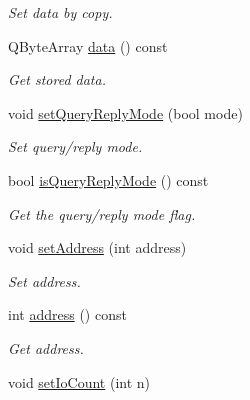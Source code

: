 \begin{DoxyCompactItemize}
\begin{DoxyCompactList}\small\item\em Set data by copy. \end{DoxyCompactList}\item 
\hypertarget{classmdt_port_transaction_a2b4f95dae82de8853e12138b4db616a0}{
QByteArray \hyperlink{classmdt_port_transaction_a2b4f95dae82de8853e12138b4db616a0}{data} () const }
\label{classmdt_port_transaction_a2b4f95dae82de8853e12138b4db616a0}

\begin{DoxyCompactList}\small\item\em Get stored data. \end{DoxyCompactList}\item 
void \hyperlink{classmdt_port_transaction_a6bd68a89059c790f475b8ff78c943656}{setQueryReplyMode} (bool mode)
\begin{DoxyCompactList}\small\item\em Set query/reply mode. \end{DoxyCompactList}\item 
bool \hyperlink{classmdt_port_transaction_a9da1cc7a191cd21a2e532d277aa3c628}{isQueryReplyMode} () const 
\begin{DoxyCompactList}\small\item\em Get the query/reply mode flag. \end{DoxyCompactList}\item 
\hypertarget{classmdt_port_transaction_a7f43ee802c0dee3ee77b45188378f86e}{
void \hyperlink{classmdt_port_transaction_a7f43ee802c0dee3ee77b45188378f86e}{setAddress} (int address)}
\label{classmdt_port_transaction_a7f43ee802c0dee3ee77b45188378f86e}

\begin{DoxyCompactList}\small\item\em Set address. \end{DoxyCompactList}\item 
\hypertarget{classmdt_port_transaction_a0c454829c2d1c2ea1b8bcc9797b2d46b}{
int \hyperlink{classmdt_port_transaction_a0c454829c2d1c2ea1b8bcc9797b2d46b}{address} () const }
\label{classmdt_port_transaction_a0c454829c2d1c2ea1b8bcc9797b2d46b}

\begin{DoxyCompactList}\small\item\em Get address. \end{DoxyCompactList}\item 
\hypertarget{classmdt_port_transaction_a1d68527258d24907b7fe113aa364c1a3}{
void \hyperlink{classmdt_port_transaction_a1d68527258d24907b7fe113aa364c1a3}{setIoCount} (int n)}
\label{classmdt_port_transaction_a1d68527258d24907b7fe113aa364c1a3}


\end{DoxyCompactItemize}
